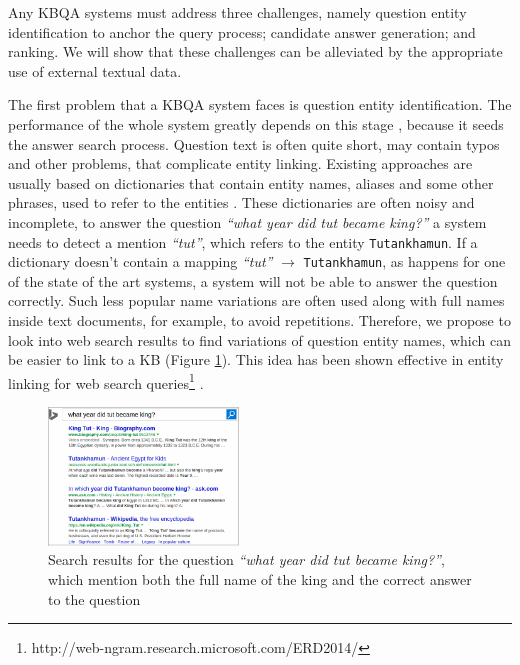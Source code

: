 Any KBQA systems must address three challenges, namely question entity identification to anchor the query process; candidate answer generation; and ranking.
We will show that these challenges can be alleviated by the appropriate use of external textual data.

The first problem that a KBQA system faces is question entity identification.
The performance of the whole system greatly depends on this stage \cite{yao-scratch-qa-naacl2015}, because it seeds the answer search process.
Question text is often quite short, may contain typos and other problems, that complicate entity linking.
Existing approaches are usually based on dictionaries that contain entity names, aliases and some other phrases, used to refer to the entities \cite{SPITKOVSKY12.266}.
These dictionaries are often noisy and incomplete, \eg to answer the question \textit{``what year did tut became king?''} a system needs to detect a mention \textit{``tut''}, which refers to the entity \texttt{Tutankhamun}.
If a dictionary doesn't contain a mapping \textit{``tut''} $\rightarrow$ \texttt{Tutankhamun}, as happens for one of the state of the art systems, a system will not be able to answer the question correctly.
Such less popular name variations are often used along with full names inside text documents, for example, to avoid repetitions.
Therefore, we propose to look into web search results to find variations of question entity names, which can be easier to link to a KB (Figure \ref{fig:web_search_entitylink}).
This idea has been shown effective in entity linking for web search queries\footnote{http://web-ngram.research.microsoft.com/ERD2014/} \cite{SMAPH_ERD:2014}.

\begin{figure}[!h]
\centering
\includegraphics[width=0.45\textwidth]{img/web_search_entitylink}
\vspace{-3mm}
\caption{Search results for the question \textit{``what year did tut became king?''}, which mention both the full name of the king and the correct answer to the question}
\label{fig:web_search_entitylink}
\end{figure}

